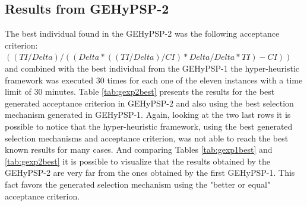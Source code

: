 \documentclass[conference]{IEEEtran}
\begin{document}
\begin{table}[]
	\centering
	\caption{Results from the best individual found in GEHyPSP-1}
	\label{tab:gexp1best}
\end{table}

\subsection{Results from GEHyPSP-2}

The best individual found in the GEHyPSP-2 was the following acceptance criterion:  $( ( TI / Delta ) / ( ( Delta * ( ( TI / Delta ) / CI ) * Delta / Delta * TI ) - CI ) )$ and combined with the best individual from the GEHyPSP-1 the hyper-heuristic framework was executed 30 times for each one of the eleven instances with a time limit of 30 minutes. Table \ref{tab:gexp2best} presents the results for the best generated acceptance criterion in GEHyPSP-2 and also using the best selection mechanism generated in GEHyPSP-1. Again, looking at the two last rows it is possible to notice that the hyper-heuristic framework, using the best generated selection mechanisms and acceptance criterion, was not able to reach the best known results for many cases. And comparing Tables \ref{tab:gexp1best} and \ref{tab:gexp2best} it is possible to visualize that the results obtained by the GEHyPSP-2 are very far from the ones obtained by the first GEHyPSP-1. This fact favors the generated selection mechanism using the "better or equal" acceptance criterion.
\end{document}
